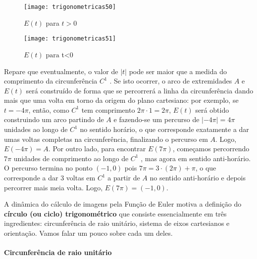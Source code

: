 \begin{minipage}{.45\linewidth}
\begin{figure}[H]
\centering

\texttt{[image: trigonometricas50]}
\caption{$E(t)$ para $t>0$}

\end{figure}
\end{minipage}
\begin{minipage}{.45\linewidth}
\begin{figure}[H]
\centering

\texttt{[image: trigonometricas51]}
\caption{$E(t) \text{ para } $t<0}

\end{figure}
\end{minipage}

Repare que eventualmente, o valor de $|t|$ pode ser maior que a medida do comprimento da circunferência $C^1$ . Se isto ocorrer, o arco de extremidades $A$ e $E(t)$ será construído de forma que se percorrerá a linha da circunferência dando mais que uma volta em torno da origem do plano cartesiano: por exemplo, se $t=-4\pi$, então, como $C^1$ tem comprimento $2\pi\cdot1=2\pi$, $E(t)$ será obtido construindo um arco partindo de $A$ e fazendo-se um percurso de $|-4\pi |=4\pi$ unidades ao longo de $C^1$ no sentido horário, o que corresponde exatamente a dar umas voltas completas na circunferência, finalizando o percurso em $A$. Logo, $E(-4\pi)=A$. Por outro lado, para encontrar $E(7\pi)$, começamos percorrendo $7\pi$ unidades de comprimento ao longo de $C^1$ , mas agora em sentido anti-horário. O percurso termina no ponto $(-1,0)$ pois $7\pi=3\cdot(2\pi)+\pi$, o que corresponde a dar $3$ voltas em $C^1$ a partir de $A$ no sentido anti-horário e depois percorrer mais meia volta. Logo, $E(7\pi) = (-1,0)$.

A dinâmica do cálculo de imagens pela Função de Euler motiva a definição do \textbf{círculo (ou ciclo) trigonométrico} que consiste essencialmente em três ingredientes: circunferência de raio unitário, sistema de eixos cartesianos e orientação. Vamos falar um pouco sobre cada um deles.

\paragraph{Circunferência de raio unitário}

